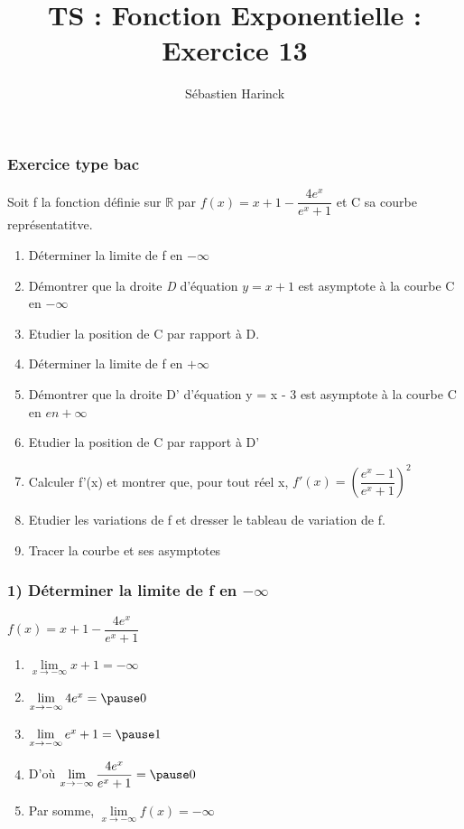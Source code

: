 \documentclass[t]{beamer}
\title{TS : Fonction Exponentielle : Exercice 13}
\author{Sébastien Harinck}
\institute{www.cours-futes.com}
\date{}
\begin{document}
\begin{frame}
\titlepage
\end{frame}

\begin{frame}
\frametitle{Exercice type bac}
Soit f la fonction définie sur $\mathbb{R}$ par $f(x)= x + 1 - \dfrac{4e^x}{e^x+1}$
et C sa courbe représentatitve.
\begin{enumerate}
\item<+-> Déterminer la limite de f en $ - \infty $
\item<+-> Démontrer que la droite \textit{D} d'équation $y=x+1$ est asymptote à la courbe C en $ -\infty $
\item<+-> Etudier la position de C par rapport à D.
\item<+-> Déterminer la limite de f en $ + \infty $
\item<+-> Démontrer que la droite D' d'équation y = x - 3 est asymptote à la courbe C en $ en + \infty $
\item<+-> Etudier la position de C par rapport à D'
\item<+-> Calculer f'(x) et montrer que, pour tout réel x, $f'(x)  = \left( \dfrac{e^x-1}{e^x+1} \right)^2 $
\item<+-> Etudier les variations de f et dresser le tableau de variation de f.
\item<+-> Tracer la courbe et ses asymptotes 
\end{enumerate}
\end{frame}

\begin{frame}
\frametitle{1) Déterminer la limite de f en $ - \infty $}
\( f(x)= x + 1 - \dfrac{4e^x}{e^x+1} \)
\begin{enumerate}[]
\item \( \lim\limits_{ x \rightarrow -\infty } x + 1 = - \infty \)
\item \( \lim\limits_{ x \rightarrow - \infty } 4e^x = \pause 0 \)
\item \( \lim\limits_{ x \rightarrow - \infty } e^x + 1 = \pause 1 \)
\item D'où \( \lim\limits_{ x \rightarrow -\infty } \dfrac{4e^x}{e^x + 1} = \pause 0 \)
\item Par somme, \pause \( \lim\limits_{ x \rightarrow -\infty } f(x) = -\infty \)
\end{enumerate}
\end{frame}
\end{document}
